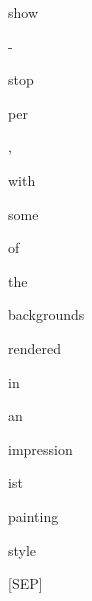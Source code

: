\documentclass[varwidth=150mm]{standalone}
\begin{document}
\begin{CJK*}{UTF8}{gbsn}
{{{\colorbox{red!0.0}{\strut show} \colorbox{red!1.770379900932312}{\strut -} \colorbox{red!0.0}{\strut stop}\colorbox{red!2.8045575618743896}{\strut per} \colorbox{red!0.0}{\strut ,} \colorbox{red!3.565305709838867}{\strut with} \colorbox{red!0.0}{\strut some} \colorbox{red!0.0}{\strut of} \colorbox{red!7.118588447570801}{\strut the} \colorbox{red!1.877854347229004}{\strut backgrounds} \colorbox{red!1.447283387184143}{\strut rendered} \colorbox{red!0.0}{\strut in} \colorbox{red!5.064661979675293}{\strut an} \colorbox{red!3.1983017921447754}{\strut impression}\colorbox{red!3.550233840942383}{\strut ist} \colorbox{red!3.291203022003174}{\strut painting} \colorbox{red!6.581941604614258}{\strut style} \colorbox{red!6.39384651184082}{\strut [SEP]}
}}}
\end{CJK*}
\end{document}
